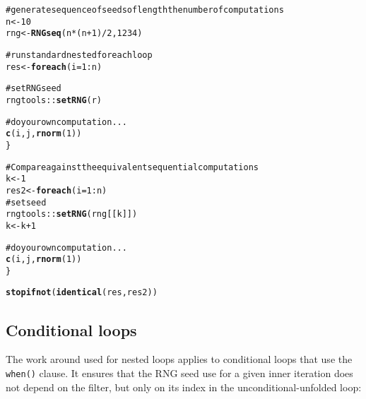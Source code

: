 \documentclass[a4paper,12pt]{article}\usepackage{graphicx, color}
\makeatletter
\newcommand{\hlfunctioncall}[1]{\textcolor[rgb]{0.501960784313725,0,0.329411764705882}{\textbf{#1}}}%
\newcommand{\hlcomment}[1]{\textcolor[rgb]{0.180392156862745,0.6,0.341176470588235}{#1}}%
\newenvironment{kframe}{%
 \def\at@end@of@kframe{}%
 \ifinner\ifhmode%
  \def\at@end@of@kframe{\end{minipage}}%
  \begin{minipage}{\columnwidth}%
 \fi\fi%
 \def\FrameCommand##1{\hskip\@totalleftmargin \hskip-\fboxsep
 \colorbox{shadecolor}{##1}\hskip-\fboxsep
     \hskip-\linewidth \hskip-\@totalleftmargin \hskip\columnwidth}%
 \MakeFramed {\advance\hsize-\width
   \@totalleftmargin\z@ \linewidth\hsize
   \@setminipage}}%
 {\par\unskip\endMakeFramed%
 \at@end@of@kframe}
\newenvironment{knitrout}{}{} %
\renewenvironment{knitrout}{\begin{footnotesize}}{\end{footnotesize}}
\let\code=\texttt
\makeatother
\begin{document}
\begin{knitrout}
\color{fgcolor}\begin{kframe}
\begin{alltt}
\hlcomment{# generate sequence of seeds of length the number of computations}
n <- 10
rng <- \hlfunctioncall{RNGseq}(n * (n + 1)/2, 1234)

\hlcomment{# run standard nested foreach loop}
res <- \hlfunctioncall{foreach}(i = 1:n) %:% \hlfunctioncall{foreach}(j = 1:i, r = rng[(i - 1) * i/2 + 1:i]) %dopar% \{
    
    \hlcomment{# set RNG seed}
    rngtools::\hlfunctioncall{setRNG}(r)
    
    \hlcomment{# do your own computation ...}
    \hlfunctioncall{c}(i, j, \hlfunctioncall{rnorm}(1))
\}

\hlcomment{# Compare against the equivalent sequential computations}
k <- 1
res2 <- \hlfunctioncall{foreach}(i = 1:n) %:% \hlfunctioncall{foreach}(j = 1:i) %do% \{
    \hlcomment{# set seed}
    rngtools::\hlfunctioncall{setRNG}(rng[[k]])
    k <- k + 1
    
    \hlcomment{# do your own computation ...}
    \hlfunctioncall{c}(i, j, \hlfunctioncall{rnorm}(1))
\}

\hlfunctioncall{stopifnot}(\hlfunctioncall{identical}(res, res2))
\end{alltt}
\end{kframe}
\end{knitrout}


\subsection{Conditional loops}
The work around used for nested loops applies to conditional loops that use the \code{when()} 
clause.
It ensures that the RNG seed use for a given inner iteration does not depend on the 
filter, but only on its index in the unconditional-unfolded loop:
\end{document}
